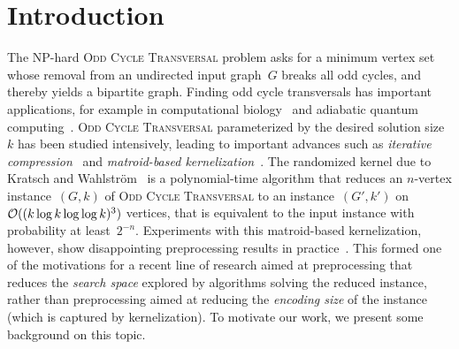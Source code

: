 \section{Introduction} \label{sec:intro}


The NP-hard \textsc{Odd Cycle Transversal} problem asks for a minimum vertex set whose removal from an undirected input graph~$G$ breaks all odd cycles, and thereby yields a bipartite graph. Finding odd cycle transversals has important applications, for example in computational biology~\cite{Huffner09,Wernicke14} and adiabatic quantum computing~\cite{GoodrichHS21,Goodrich18}. \textsc{Odd Cycle Transversal} parameterized by the desired solution size~$k$ has been studied intensively, leading to important advances such as \emph{iterative compression}~\cite{ReedSV04} and \emph{matroid-based kernelization}~\cite{KratschW14,KratschW20}. The randomized kernel due to Kratsch and Wahlstr\"{o}m~\cite[Lemma 7.11]{KratschW20} is a polynomial-time algorithm that reduces an $n$-vertex instance~$(G,k)$ of \textsc{Odd Cycle Transversal} to an instance~$(G',k')$ on~$\mathcal{O}((k \log k \log \log k)^3)$ vertices, that is equivalent to the input instance with probability at least~$2^{-n}$. Experiments with this matroid-based kernelization, however, show disappointing preprocessing results in practice~\cite{PilipczukZ18}. This formed one of the motivations for a recent line of research aimed at preprocessing that reduces the \emph{search space} explored by algorithms solving the reduced instance, rather than preprocessing aimed at reducing the \emph{encoding size} of the instance (which is captured by kernelization). To motivate our work, we present some background on this topic.

